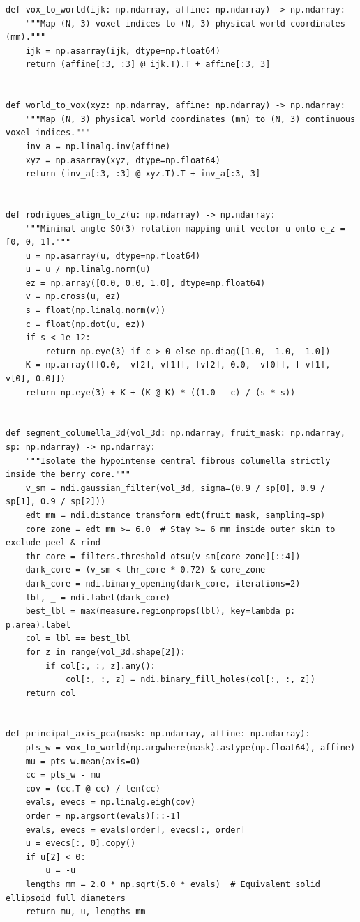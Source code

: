 \documentclass[10pt,a4paper]{article}
\renewcommand{\_}{\origunderscore\allowbreak}
\begin{document}
\begin{codebox}
\begin{lstlisting}[style=pybmed]
def vox_to_world(ijk: np.ndarray, affine: np.ndarray) -> np.ndarray:
    """Map (N, 3) voxel indices to (N, 3) physical world coordinates (mm)."""
    ijk = np.asarray(ijk, dtype=np.float64)
    return (affine[:3, :3] @ ijk.T).T + affine[:3, 3]


def world_to_vox(xyz: np.ndarray, affine: np.ndarray) -> np.ndarray:
    """Map (N, 3) physical world coordinates (mm) to (N, 3) continuous voxel indices."""
    inv_a = np.linalg.inv(affine)
    xyz = np.asarray(xyz, dtype=np.float64)
    return (inv_a[:3, :3] @ xyz.T).T + inv_a[:3, 3]


def rodrigues_align_to_z(u: np.ndarray) -> np.ndarray:
    """Minimal-angle SO(3) rotation mapping unit vector u onto e_z = [0, 0, 1]."""
    u = np.asarray(u, dtype=np.float64)
    u = u / np.linalg.norm(u)
    ez = np.array([0.0, 0.0, 1.0], dtype=np.float64)
    v = np.cross(u, ez)
    s = float(np.linalg.norm(v))
    c = float(np.dot(u, ez))
    if s < 1e-12:
        return np.eye(3) if c > 0 else np.diag([1.0, -1.0, -1.0])
    K = np.array([[0.0, -v[2], v[1]], [v[2], 0.0, -v[0]], [-v[1], v[0], 0.0]])
    return np.eye(3) + K + (K @ K) * ((1.0 - c) / (s * s))


def segment_columella_3d(vol_3d: np.ndarray, fruit_mask: np.ndarray, sp: np.ndarray) -> np.ndarray:
    """Isolate the hypointense central fibrous columella strictly inside the berry core."""
    v_sm = ndi.gaussian_filter(vol_3d, sigma=(0.9 / sp[0], 0.9 / sp[1], 0.9 / sp[2]))
    edt_mm = ndi.distance_transform_edt(fruit_mask, sampling=sp)
    core_zone = edt_mm >= 6.0  # Stay >= 6 mm inside outer skin to exclude peel & rind
    thr_core = filters.threshold_otsu(v_sm[core_zone][::4])
    dark_core = (v_sm < thr_core * 0.72) & core_zone
    dark_core = ndi.binary_opening(dark_core, iterations=2)
    lbl, _ = ndi.label(dark_core)
    best_lbl = max(measure.regionprops(lbl), key=lambda p: p.area).label
    col = lbl == best_lbl
    for z in range(vol_3d.shape[2]):
        if col[:, :, z].any():
            col[:, :, z] = ndi.binary_fill_holes(col[:, :, z])
    return col


def principal_axis_pca(mask: np.ndarray, affine: np.ndarray):
    pts_w = vox_to_world(np.argwhere(mask).astype(np.float64), affine)
    mu = pts_w.mean(axis=0)
    cc = pts_w - mu
    cov = (cc.T @ cc) / len(cc)
    evals, evecs = np.linalg.eigh(cov)
    order = np.argsort(evals)[::-1]
    evals, evecs = evals[order], evecs[:, order]
    u = evecs[:, 0].copy()
    if u[2] < 0:
        u = -u
    lengths_mm = 2.0 * np.sqrt(5.0 * evals)  # Equivalent solid ellipsoid full diameters
    return mu, u, lengths_mm



\end{lstlisting}
\end{codebox}
\end{document}
